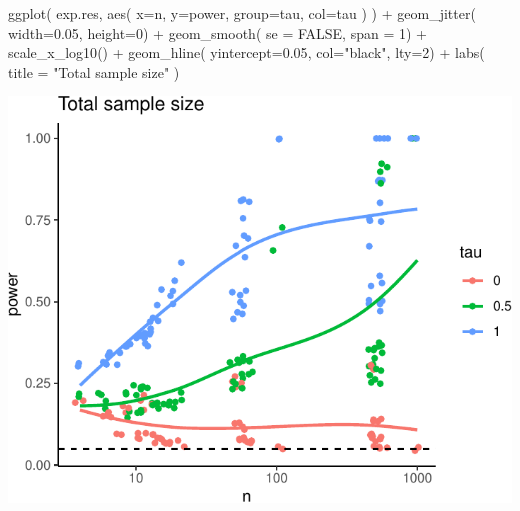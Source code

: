 \documentclass[
]{book}
\newenvironment{Shaded}{\begin{snugshade}}{\end{snugshade}}
\newcommand{\AttributeTok}[1]{\textcolor[rgb]{0.77,0.63,0.00}{#1}}
\newcommand{\ConstantTok}[1]{\textcolor[rgb]{0.00,0.00,0.00}{#1}}
\newcommand{\DecValTok}[1]{\textcolor[rgb]{0.00,0.00,0.81}{#1}}
\newcommand{\FloatTok}[1]{\textcolor[rgb]{0.00,0.00,0.81}{#1}}
\newcommand{\FunctionTok}[1]{\textcolor[rgb]{0.00,0.00,0.00}{#1}}
\newcommand{\NormalTok}[1]{#1}
\newcommand{\SpecialCharTok}[1]{\textcolor[rgb]{0.00,0.00,0.00}{#1}}
\newcommand{\StringTok}[1]{\textcolor[rgb]{0.31,0.60,0.02}{#1}}
\begin{document}
\begin{Shaded}
\begin{Highlighting}[]
\FunctionTok{ggplot}\NormalTok{( exp.res, }\FunctionTok{aes}\NormalTok{( }\AttributeTok{x=}\NormalTok{n, }\AttributeTok{y=}\NormalTok{power, }\AttributeTok{group=}\NormalTok{tau, }\AttributeTok{col=}\NormalTok{tau ) ) }\SpecialCharTok{+}
  \FunctionTok{geom\_jitter}\NormalTok{( }\AttributeTok{width=}\FloatTok{0.05}\NormalTok{, }\AttributeTok{height=}\DecValTok{0}\NormalTok{) }\SpecialCharTok{+}
  \FunctionTok{geom\_smooth}\NormalTok{( }\AttributeTok{se =} \ConstantTok{FALSE}\NormalTok{, }\AttributeTok{span =} \DecValTok{1}\NormalTok{) }\SpecialCharTok{+}
  \FunctionTok{scale\_x\_log10}\NormalTok{() }\SpecialCharTok{+}
  \FunctionTok{geom\_hline}\NormalTok{( }\AttributeTok{yintercept=}\FloatTok{0.05}\NormalTok{, }\AttributeTok{col=}\StringTok{"black"}\NormalTok{, }\AttributeTok{lty=}\DecValTok{2}\NormalTok{) }\SpecialCharTok{+}
  \FunctionTok{labs}\NormalTok{( }\AttributeTok{title =} \StringTok{"Total sample size"}\NormalTok{ )}
\end{Highlighting}
\end{Shaded}

\begin{center}\includegraphics[width=0.75\linewidth]{Designing-Simulations-in-R_files/figure-latex/plotA-1} \end{center}
\end{document}
